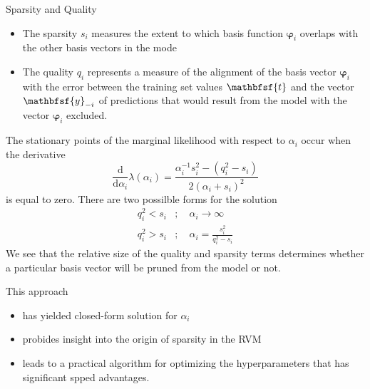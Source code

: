 \documentclass{bredelebeamer}
\begin{document}
\begin{frame}{Sparsity and Quality}
  \begin{itemize}
    \item The sparsity $s_i$ measures the extent to which basis function $\boldsymbol{\varphi}_i$
          overlaps with the other basis vectors in the mode
    \item The quality $q_i$ represents a measure of the alignment of the basis vector
          $\boldsymbol{\varphi}_i$ with the error between the training set values $\mathbfsf{t}$
          and the vector $\mathbfsf{y}_{-i}$ of predictions that would result from
          the model with the vector $\boldsymbol{\varphi}_i$ excluded.
  \end{itemize}
  The stationary points of the marginal likelihood with respect to $\alpha_i$ occur
  when the derivative
  \begin{equation}
    \frac{\mathrm{d}}{\mathrm{d}\alpha_i} \lambda (\alpha_i)
    = \frac{\alpha_i^{-1} s_i^2 - (q_i^2 - s_i)}{2{(\alpha_i + s_i)}^2}
  \end{equation}
  is equal to zero. There are two possilble forms for the solution
  \begin{equation}
    \begin{split}
      q_i^2 < s_i &; \quad \alpha_i \rightarrow \infty \\
      q_i^2 > s_i &; \quad \alpha_i = \frac{s_i^2}{q_i^2 - s_i}
    \end{split}
  \end{equation}
  We see that the relative size of the quality and sparsity terms determines whether
  a particular basis vector will be pruned from the model or not.

  This approach
  \begin{itemize}
    \item has yielded closed-form solution for $\alpha_i$
    \item probides insight into the origin of sparsity in the RVM
    \item leads to a practical algorithm for optimizing the hyperparameters
          that has significant spped advantages.
  \end{itemize}
\end{frame}
\end{document}
